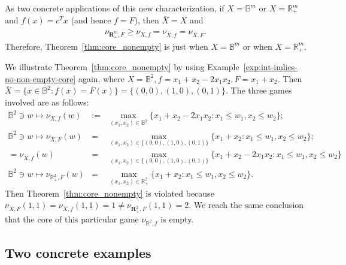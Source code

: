 \documentclass[11pt]{article}\usepackage[]{graphicx}\usepackage[]{xcolor}
\begin{document}
As two concrete applications of this new characterization, if $X=\mathbb{B}^m$ or $X=\mathbb{R}^m_{+}$ and $f(x)=c^Tx$ (and hence $f=F$), then $\overline{X}=X$ and
\begin{eqnarray*}
\nu_{\mathbf{R}^m_{+}, F}\ge \nu_{X, f}=\nu_{\overline{X}, f}= \nu_{\overline{X}, F}.
\end{eqnarray*}
Therefore, Theorem~\ref{thm:core_nonempty} is just \citep[Theorem 1]{deng1999algorithmic} when $X=\mathbb{B}^m$ or \citep[Theorem 4]{samet1984core} when $X=\mathbb{R}^m_{+}$. 



We illustrate Theorem~\ref{thm:core_nonempty} by using Example~\ref{exp:int-imlies-no-non-empty-core} again, where $X=\mathbb{B}^2, f=x_1+x_2-2x_1x_2, F=x_1+x_2$. Then $\overline{X}=\{x\in \mathbb{B}^2: f(x)=F(x)\}=\{(0,0), (1,0), (0,1)\}$. The three games involved are as follows: 
\begin{eqnarray*}
\mathbb{B}^2\ni w\mapsto \nu_{X,f}(w)&:=&\max_{(x_1, x_2)\in\mathbb{B}^2}\{x_1+x_2-2x_1x_2: x_1\le w_1, x_2\le w_2\};\\
\mathbb{B}^2\ni w\mapsto \nu_{\overline{X},F}(w)&=&\max_{(x_1, x_2)\in\{(0,0), (1,0), (0,1)\}}\{x_1+x_2: x_1\le w_1, x_2\le w_2\};\\
= \nu_{\overline{X},f}(w)&=&\max_{(x_1, x_2)\in\{(0,0), (1,0), (0,1)\}}\{x_1+x_2-2x_1x_2: x_1\le w_1, x_2\le w_2\}\\
\mathbb{B}^2\ni w\mapsto \nu_{\mathbb{R}^2_{+},F}(w)&=&\max_{(x_1, x_2)\in\mathbb{R}^2_{+}}\{x_1+x_2: x_1\le w_1, x_2\le w_2\}.
\end{eqnarray*}
Then Theorem~\ref{thm:core_nonempty} is violated because $\nu_{\overline{X},F}(1,1)=\nu_{\overline{X},f}(1,1)=1\ne \nu_{\mathbf{R}^2_{+},F}(1,1)=2$. We reach the same conclusion that the core of this particular game $\nu_{\mathbb{B}^2,f}$ is empty.





\subsection{Two concrete examples}\label{subsec:examples-illustrative-concrete}
\end{document}
